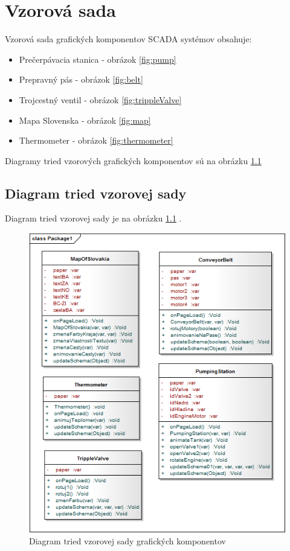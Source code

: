 \chapter{Vzorová sada}

Vzorová sada grafických komponentov SCADA systémov obsahuje:
\begin{itemize}
	\item Prečerpávacia stanica - obrázok \ref{fig:pump}
	\item Prepravný pás - obrázok \ref{fig:belt}
	\item Trojcestný ventil - obrázok \ref{fig:trippleValve}
	\item Mapa Slovenska - obrázok \ref{fig:map}
	\item Thermometer - obrázok \ref{fig:thermometer}
\end{itemize}

Diagramy tried vzorových grafických komponentov sú na obrázku \ref{fig:classD}


\section{Diagram tried vzorovej sady}
Diagram tried vzorovej sady je na obrázku \ref{fig:classD} . 
\begin{figure}[hp]
	\centering
	\includegraphics[width=0.9\linewidth]{uml/classDiagramTried.png}
	\caption{Diagram tried vzorovej sady grafických komponentov}
	\label{fig:classD}
\end{figure}



